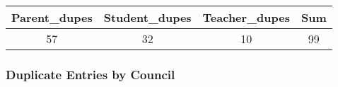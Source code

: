 \documentclass[]{article}
\begin{document}
\begin{longtable}[]{@{}cccc@{}}
\toprule
\begin{minipage}[b]{0.18\columnwidth}\centering\strut
Parent\_dupes\strut
\end{minipage} & \begin{minipage}[b]{0.20\columnwidth}\centering\strut
Student\_dupes\strut
\end{minipage} & \begin{minipage}[b]{0.20\columnwidth}\centering\strut
Teacher\_dupes\strut
\end{minipage} & \begin{minipage}[b]{0.06\columnwidth}\centering\strut
Sum\strut
\end{minipage}\tabularnewline
\midrule
\endhead
\begin{minipage}[t]{0.18\columnwidth}\centering\strut
57\strut
\end{minipage} & \begin{minipage}[t]{0.20\columnwidth}\centering\strut
32\strut
\end{minipage} & \begin{minipage}[t]{0.20\columnwidth}\centering\strut
10\strut
\end{minipage} & \begin{minipage}[t]{0.06\columnwidth}\centering\strut
99\strut
\end{minipage}\tabularnewline
\bottomrule
\end{longtable}

\subsubsection{Duplicate Entries by
Council}\label{duplicate-entries-by-council}
\end{document}
